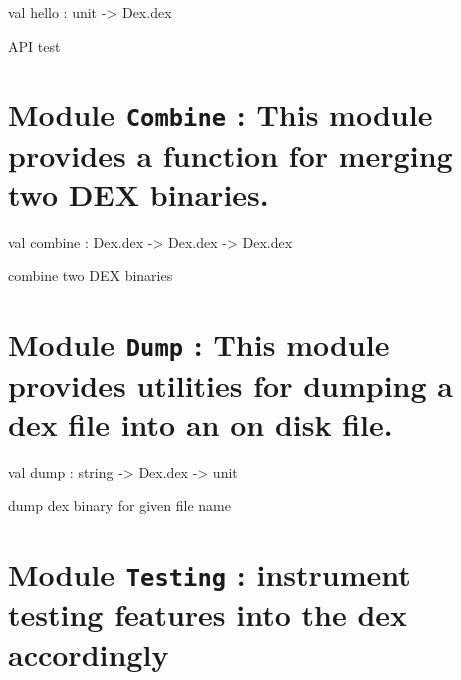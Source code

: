 \documentclass[11pt]{article}
\begin{document}
\label{val:Modify.hello}\begin{ocamldoccode}
val hello : unit -> Dex.dex
\end{ocamldoccode}
\begin{ocamldocdescription}
API test


\end{ocamldocdescription}


\section{Module {\tt{Combine}} : This module provides a function for merging two DEX binaries.}
\label{module:Combine}




\ocamldocvspace{0.5cm}



\label{val:Combine.combine}\begin{ocamldoccode}
val combine : Dex.dex -> Dex.dex -> Dex.dex
\end{ocamldoccode}
\begin{ocamldocdescription}
combine two DEX binaries


\end{ocamldocdescription}


\section{Module {\tt{Dump}} : This module provides utilities for dumping a dex file into an on
    disk file.}
\label{module:Dump}




\ocamldocvspace{0.5cm}



\label{val:Dump.dump}\begin{ocamldoccode}
val dump : string -> Dex.dex -> unit
\end{ocamldoccode}
\begin{ocamldocdescription}
dump dex binary for given file name


\end{ocamldocdescription}


\section{Module {\tt{Testing}} : instrument testing features into the dex accordingly}
\label{module:Testing}
\end{document}
